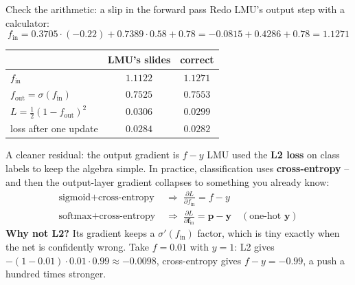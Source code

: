 \documentclass[aspectratio=43]{beamer}
\begin{document}
\begin{frame}{Check the arithmetic: a slip in the forward pass}
  \small
  Redo LMU's output step with a calculator:
  \[
    f_{\text{in}} = 0.3705\cdot(-0.22) + 0.7389\cdot 0.58 + 0.78
      = -0.0815 + 0.4286 + 0.78 = \mathbf{1.1271}
  \]
  \begin{center}\small
  \begin{tabular}{@{}l c c@{}}
    & \textbf{LMU's slides} & \textbf{correct} \\ \hline
    $f_{\text{in}}$ & $1.1122$ & $1.1271$ \\
    $f_{\text{out}} = \sigma(f_{\text{in}})$ & $0.7525$ & $0.7553$ \\
    $L = \tfrac12(1-f_{\text{out}})^2$ & $0.0306$ & $0.0299$ \\
    loss after one update & $0.0284$ & $0.0282$ \\
  \end{tabular}
  \end{center}
  \vfill
\end{frame}



\begin{frame}{A cleaner residual: the output gradient is $f - y$}
  LMU used the \textbf{L2 loss} on class labels to keep the algebra simple. In practice,
  classification uses \textbf{cross-entropy} -- and then the output-layer gradient collapses to
  something you already know:
  \begin{align*}
    \text{sigmoid} + \text{cross-entropy} &\;\Longrightarrow\;
      \frac{\partial L}{\partial f_{\text{in}}} = f - y \\
    \text{softmax} + \text{cross-entropy} &\;\Longrightarrow\;
      \frac{\partial L}{\partial \mathbf{f}_{\text{in}}} = \mathbf{p} - \mathbf{y}
      \quad(\text{one-hot } \mathbf{y})
  \end{align*}
  {\small \textbf{Why not L2?} Its gradient keeps a $\sigma'(f_{\text{in}})$ factor, which is tiny
  exactly when the net is confidently wrong. Take $f = 0.01$ with $y = 1$: L2 gives
  $-(1-0.01)\cdot 0.01\cdot 0.99 \approx -0.0098$, cross-entropy gives $f - y = -0.99$, a push
  a hundred times stronger.}
  \vfill
\end{frame}
\end{document}
